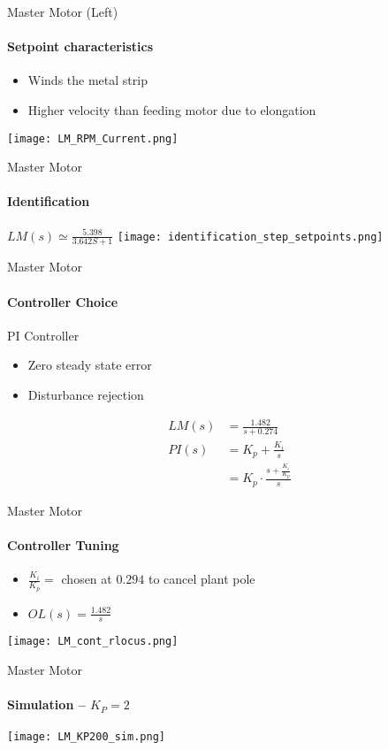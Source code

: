 \begin{frame}{Master Motor (Left)}
  \framesubtitle{Setpoint characteristics}
	\begin{itemize}
		\item Winds the metal strip
		\item Higher velocity than feeding motor due to elongation
	\end{itemize}
  \centering
  \texttt{[image: LM\_RPM\_Current.png]}

	\end{frame}

\begin{frame}{Master Motor}
  \framesubtitle{Identification}
  $LM(s) \simeq \frac{5.398}{3.642S+1}$
	\centering
	\texttt{[image: identification\_step\_setpoints.png]}
\end{frame}

\begin{frame}{Master Motor}
  \framesubtitle{Controller Choice}
\begin{block}{PI Controller}
	\begin{itemize}
		\item Zero steady state error
		\item Disturbance rejection
	\end{itemize}
  \begin{align*}
  LM(s) &= \frac{1.482}{s+0.274}\\
  PI(s) &= K_p + \frac{K_i}{s}\\
        &= K_p \cdot \frac{s+\frac{K_i}{K_p}}{s}
\end{align*}
\end{block}
\end{frame}

\begin{frame}{Master Motor}
\framesubtitle{Controller Tuning}
\begin{itemize}
\item $\frac{K_i}{K_p} =$ chosen at $0.294$ to cancel plant pole
\item $OL(s) = \frac{1.482}{s}$
\end{itemize}
\centering
\texttt{[image: LM\_cont\_rlocus.png]}
\end{frame}



	\begin{frame}{Master Motor}
\framesubtitle{Simulation -- $K_P = 2$}

\centering
\texttt{[image: LM\_KP200\_sim.png]}
\end{frame}




